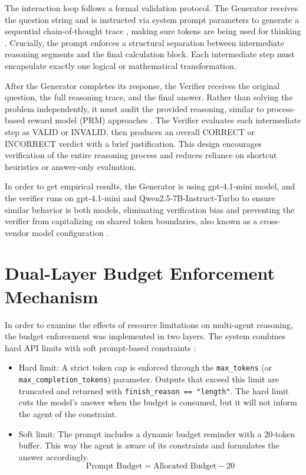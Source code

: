 \documentclass[12pt, a4paper, oneside]{report}
\begin{document}
The interaction loop follows a formal validation protocol. The Generator receives 
the question string and is instructed via system prompt parameters to generate a 
sequential chain-of-thought trace \parencite{Almaghrabi2026}, making sure tokens are being used for 
thinking \parencite{Hu2026}. Crucially, the prompt enforces a structural separation between intermediate 
reasoning segments and the final calculation block. Each intermediate step must 
encapsulate exactly one logical or mathematical transformation.

After the Generator completes its response, the Verifier receives the original 
question, the full reasoning trace, and the final answer. Rather than solving the 
problem independently, it must audit the provided reasoning, similar to process-based
reward model (PRM) approaches \parencite{Khalifa2025}. The Verifier evaluates 
each intermediate step as VALID or INVALID, then produces an overall CORRECT or 
INCORRECT verdict with a brief justification. This design encourages verification 
of the entire reasoning process and reduces reliance on shortcut heuristics or 
answer-only evaluation.

In order to get empirical results, the Generator is using gpt-4.1-mini model, and 
the verifier runs on gpt-4.1-mini and Qwen2.5-7B-Instruct-Turbo to ensure similar 
behavior is both models, eliminating verification bias and preventing the 
verifier from capitalizing on shared token boundaries, also known as a cross-vendor 
model configuration \parencite{Zhang2025tts}.

\section{Dual-Layer Budget Enforcement Mechanism}
In order to examine the effects of resource limitations on multi-agent reasoning, 
the budget enforcement was implemented in two layers.
The system combines hard API limits with soft prompt-based constraints \parencite{Wan2026}:

\begin{itemize}
    \item Hard limit: A strict token cap is enforced through the \texttt{max\_tokens} (or \texttt{max\_completion\_tokens}) 
    parameter. Outputs that exceed this limit are truncated and returned with 
    \texttt{finish\_reason == "length"}. The hard limit cuts the model's answer when the 
    budget is consumed, but it will not inform the agent of the constraint.

    \item Soft limit: The prompt includes a dynamic budget reminder with a 20-token buffer. 
    This way the agent is aware of its constraints and formulates the answer accordingly.
    $$\text{Prompt Budget} = \text{Allocated Budget} - 20$$
\end{itemize}
\end{document}
